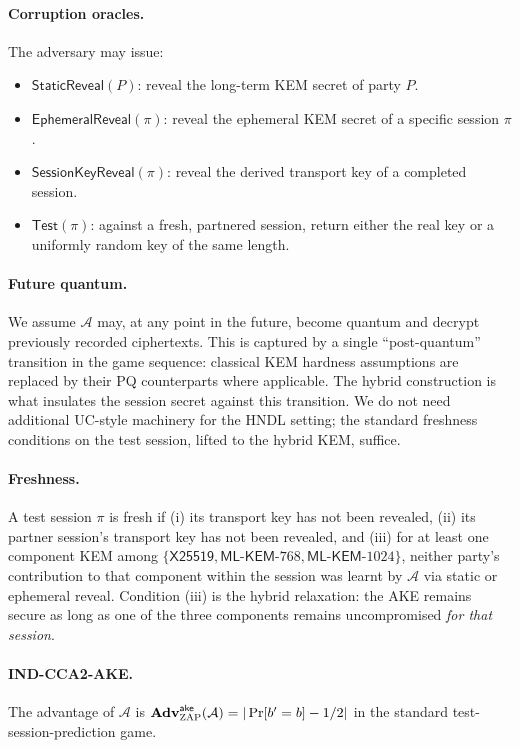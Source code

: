 \documentclass[11pt,a4paper]{article}
\theoremstyle{definition}
\theoremstyle{remark}
\newcommand{\Adv}{\ensuremath{\mathbf{Adv}}}
\newcommand{\zap}{\textsc{ZAP}}
\newcommand{\mlkem}{\ensuremath{\mathsf{ML\text{-}KEM}}}
\newcommand{\xtf}{\ensuremath{\mathsf{X25519}}}
\begin{document}
\paragraph{Corruption oracles.} The adversary may issue:
\begin{itemize}
\item $\mathsf{StaticReveal}(P)$: reveal the long-term KEM secret of party $P$.
\item $\mathsf{EphemeralReveal}(\pi)$: reveal the ephemeral KEM secret of a
specific session $\pi$.
\item $\mathsf{SessionKeyReveal}(\pi)$: reveal the derived transport key of
a completed session.
\item $\mathsf{Test}(\pi)$: against a fresh, partnered session, return either the
real key or a uniformly random key of the same length.
\end{itemize}

\paragraph{Future quantum.} We assume $\mathcal{A}$ may, at any point in
the future, become quantum and decrypt previously recorded ciphertexts.
This is captured by a single ``post-quantum'' transition in the game
sequence: classical KEM hardness assumptions are replaced by their PQ
counterparts where applicable. The hybrid construction is what insulates the
session secret against this transition. We do not need additional UC-style
machinery for the HNDL setting; the standard freshness conditions on the
test session, lifted to the hybrid KEM, suffice.

\paragraph{Freshness.} A test session $\pi$ is fresh if (i) its transport
key has not been revealed, (ii) its partner session's transport key has not
been revealed, and (iii) for at least one component KEM among
$\{\xtf, \mlkem\text{-}768, \mlkem\text{-}1024\}$, neither party's contribution
to that component within the session was learnt by $\mathcal{A}$ via static
or ephemeral reveal. Condition (iii) is the hybrid relaxation: the AKE remains
secure as long as one of the three components remains uncompromised
\emph{for that session}.

\paragraph{IND-CCA2-AKE.} The advantage of $\mathcal{A}$ is
$\Adv^{\mathsf{ake}}_{\zap}(\mathcal{A}) = |\Pr[b' = b] - 1/2|$
in the standard test-session-prediction game.
\end{document}
